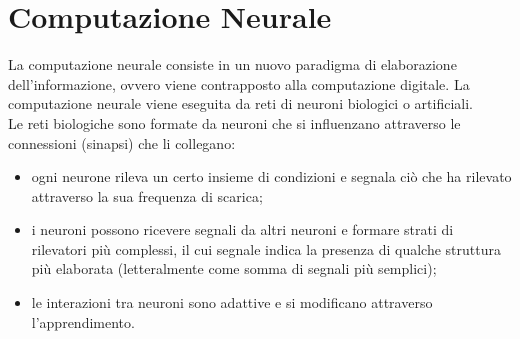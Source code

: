 \section{Computazione Neurale}
La computazione neurale consiste in un nuovo paradigma di elaborazione
dell'informazione, ovvero viene contrapposto alla computazione digitale.
La computazione neurale viene eseguita da reti di neuroni biologici o
artificiali.\\
Le reti biologiche sono formate da neuroni che si influenzano attraverso le
connessioni (sinapsi) che li collegano:
\begin{itemize}
	\item ogni neurone rileva un certo insieme di condizioni e segnala ciò che ha
	rilevato attraverso la sua frequenza di scarica;
	\item i neuroni possono ricevere segnali da altri neuroni e formare strati di
	rilevatori più complessi, il cui segnale indica la presenza di qualche struttura
	più elaborata (letteralmente come somma di segnali più semplici);

	\item le interazioni tra neuroni sono adattive e si modificano attraverso
	l'apprendimento.
\end{itemize}

